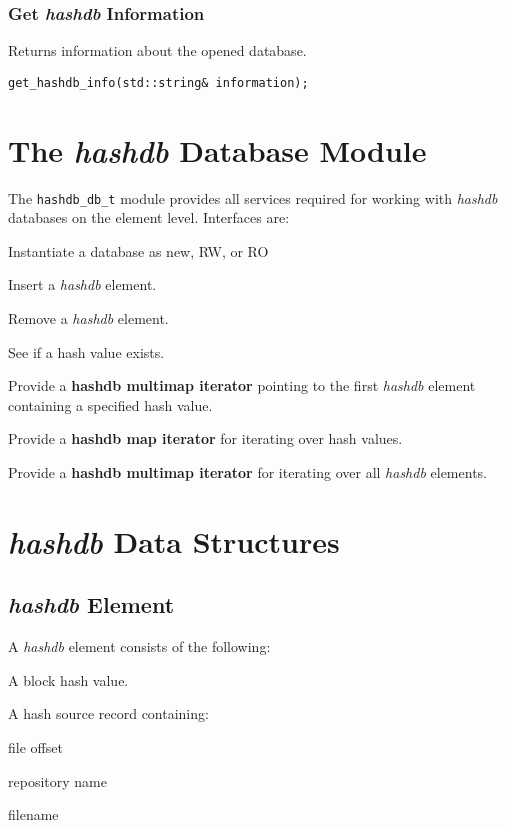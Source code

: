 \documentclass[12pt,twoside]{article}
\newcommand{\hdb}{\emph{hashdb}\xspace}
\newcommand{\hmi}{\textbf{hashdb map iterator}\xspace}
\newcommand{\hmmi}{\textbf{hashdb multimap iterator}\xspace}
\begin{document}
\subsubsection{Get \hdb Information}
Returns information about the opened database.

\begin{small}
\begin{verbatim}
get_hashdb_info(std::string& information);
\end{verbatim}
\end{small}

\section{The \hdb Database Module}
The \texttt{hashdb\_db\_t} module
provides all services required for working with \hdb databases
on the element level.
Interfaces are:
\begin{compactitem}
\item Instantiate a database as new, RW, or RO
\item Insert a \hdb element.
\item Remove a \hdb element.
\item See if a hash value exists.
\item Provide a \hmmi pointing to the first \hdb element
containing a specified hash value.
\item Provide a \hmi for iterating over hash values.
\item Provide a \hmmi for iterating over all \hdb elements.
\end{compactitem}

\section{\hdb Data Structures}
\subsection{\hdb Element}
A \hdb element consists of the following:
\begin{compactitem}
\item A block hash value.
\item A hash source record containing:
  \begin{compactitem}
  \item file offset
  \item repository name
  \item filename
  \end{compactitem}
\end{compactitem}
\end{document}
